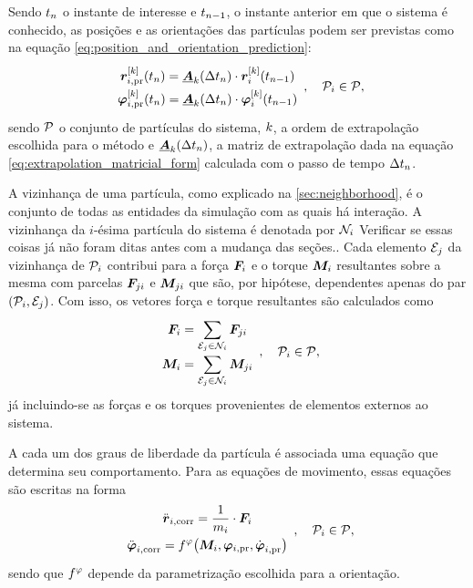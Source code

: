 Sendo \(\instant[n]\) o instante de interesse e \(\instant[n-1]\), o instante anterior em que o sistema é conhecido, as posições e as orientações das partículas podem ser previstas como na equação \eqref{eq:position_and_orientation_prediction}:
\begin{equation*}
	\def\arraystretch{1.5}
	\begin{array}{c}
		\drvec{\taylorOrder}{\positionipr}\pqty{\instant[n]} = \extrapolationMatrix{\taylorOrder}[\Dt[n]]\cdot\drvec{\taylorOrder}{\positioni}\pqty{\instant[n-1]} \\
		\drvec{\taylorOrder}{\orientationipr}\pqty{\instant[n]} = \extrapolationMatrix{\taylorOrder}[\Dt[n]]\cdot\drvec{\taylorOrder}{\orientationi}\pqty{\instant[n-1]} \\
	\end{array}, \quad \particlei \in \particleSet,
\end{equation*}
sendo \(\particleSet\) o conjunto de partículas do sistema, \(\taylorOrder\), a ordem de extrapolação escolhida para o método e \(\extrapolationMatrix{\taylorOrder}[\Dt[n]]\), a matriz de extrapolação dada na equação \eqref{eq:extrapolation_matricial_form} calculada com o passo de tempo \(\Dt[n]\).

A vizinhança de uma partícula, como explicado na \autoref{sec:neighborhood}, é o conjunto de todas as entidades da simulação com as quais há interação. A vizinhança da \(i\)-ésima partícula do sistema é denotada por \(\neighborhoodi\) \alert{Verificar se essas coisas já não foram ditas antes com a mudança das seções.}. Cada elemento \(\elementj\) da vizinhança de \(\particlei\) contribui para a força \(\forcei\) e o torque \(\torquei\) resultantes sobre a mesma com parcelas \(\forceji\) e \(\torqueji\) que são, por hipótese, dependentes apenas do par \(\orderedPair{\particlei}{\elementj}\). Com isso, os vetores força e torque resultantes são calculados como
\begin{equation*}
	\def\arraystretch{1.5}
	\begin{array}{c}
		\displaystyle \forcei = \sum_{\elementj\in\neighborhoodi} \forceji \\
		\displaystyle \torquei = \sum_{\elementj\in\neighborhoodi} \torqueji 
	\end{array}, \quad \particlei \in \particleSet,
\end{equation*}
já incluindo-se as forças e os torques provenientes de elementos externos ao sistema.

A cada um dos graus de liberdade da partícula é associada uma equação que determina seu comportamento. Para as equações de movimento, essas equações são escritas na forma
\begin{equation*}
	\def\arraystretch{1.5}
	\begin{array}{c}
		\displaystyle \accelerationicorr =  \dfrac{1}{\massi}\cdot \forcei \\
		\displaystyle \dorientationicorr{2} = \eqFor{\orientationScalar}\pqty{\torquei, \orientationipr, \dorientationipr{1}}
	\end{array}, \quad \particlei \in \particleSet,
\end{equation*}
sendo que \(\eqFor{\orientationScalar}\) depende da parametrização escolhida para a orientação.


